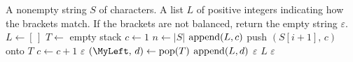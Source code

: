 
\begin{algorithmic}[1]
\Require A nonempty string $S$ of characters.
\Ensure A list $L$ of positive integers indicating how the brackets
  match. If the brackets are not balanced, return the empty string
  $\varepsilon$.
\State $L \gets [\,]$
\State $T \gets$ empty stack
\State $c \gets 1$
\State $n \gets |S|$
    \State $\operatorname*{append}(L, c)$
    \State push $(S[i+1],\, c)$ onto $T$
    \State $c \gets c + 1$
  \EndIf
      \State \Return $\varepsilon$
    \EndIf
    \State $(\MyLeft,\, d) \gets \pop(T)$
      \State $\operatorname*{append}(L, d)$
    \Else
      \State \Return $\varepsilon$
    \EndIf
  \EndIf
\EndFor
{}
  \State \Return $L$
\EndIf
\State \Return $\varepsilon$
\end{algorithmic}
